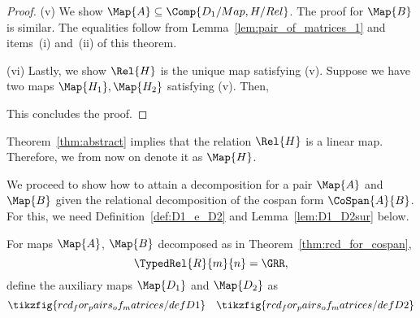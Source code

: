 \documentclass[manyauthors]{fundam}
\begin{document}
\begin{proof}
(v) We show $\Map{A} \subseteq \Comp{D_1/Map, H/Rel}$.
The proof for $\Map{B}$ is similar.
The equalities follow from Lemma~\ref{lem:pair_of_matrices_1} and items~(i) and~(ii) of this theorem.
\begin{hcalculation}[=]{}
\end{hcalculation}

(vi) Lastly, we show $\Rel{H}$ is the unique map satisfying (v).
Suppose we have two maps $\Map{H_1}, \Map{H_2}$ satisfying (v). Then,
\begin{hcalculation}[\iff]{}
\end{hcalculation}
This concludes the proof.
\end{proof}

\begin{remark}
  Theorem~\ref{thm:abstract} implies that the relation $\Rel{H}$ is a linear map.
  Therefore, we from now on denote it as $\Map{H}$.
\end{remark}

We proceed to show how to attain a decomposition for a pair $\Map{A}$ and $\Map{B}$ given the relational decomposition of the cospan form $\CoSpan{A}{B}$. For this, we need Definition~\ref{def:D1_e_D2} and Lemma~\ref{lem:D1_D2sur} below.

\begin{definition}
  \label{def:D1_e_D2}
  For maps $\Map{A}$, $\Map{B}$ decomposed as in Theorem~\ref{thm:rcd_for_cospan},
  \[\TypedRel{R}{m}{n} = \GRR,\]
  define the auxiliary maps $\Map{D_1}$ and $\Map{D_2}$ as
  \[
    \begin{aligned}
      \tikzfig{rcd_for_pairs_of_matrices/defD1} & &
      \tikzfig{rcd_for_pairs_of_matrices/defD2}
    \end{aligned}
  \]
\end{definition}
\end{document}
